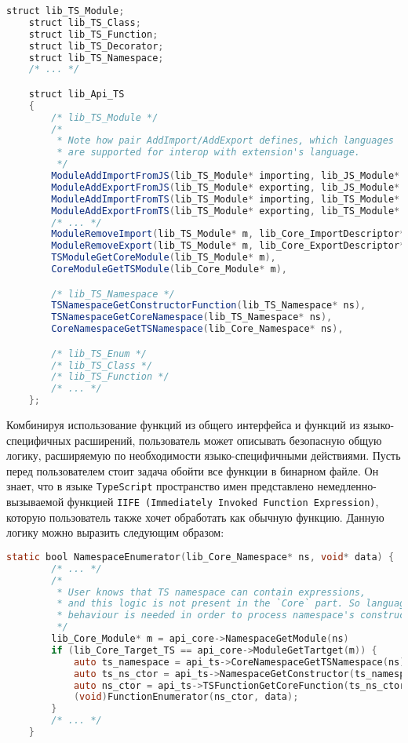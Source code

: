 \begin{lstlisting}[language=Java, caption=Примерный код расширения \texttt{Typescript}., label=lst:libTsExtension]
    struct lib_TS_Module;
    struct lib_TS_Class;
    struct lib_TS_Function;
    struct lib_TS_Decorator;
    struct lib_TS_Namespace;
    /* ... */

    struct lib_Api_TS
    {
        /* lib_TS_Module */
        /*
         * Note how pair AddImport/AddExport defines, which languages
         * are supported for interop with extension's language.
         */
        ModuleAddImportFromJS(lib_TS_Module* importing, lib_JS_Module* imported, ... payload);
        ModuleAddExportFromJS(lib_TS_Module* exporting, lib_JS_Module* exported, ... payload);
        ModuleAddImportFromTS(lib_TS_Module* importing, lib_TS_Module* imported, ... payload);
        ModuleAddExportFromTS(lib_TS_Module* exporting, lib_TS_Module* exported, ... payload);
        /* ... */
        ModuleRemoveImport(lib_TS_Module* m, lib_Core_ImportDescriptor* id);
        ModuleRemoveExport(lib_TS_Module* m, lib_Core_ExportDescriptor* ed);
        TSModuleGetCoreModule(lib_TS_Module* m),
        CoreModuleGetTSModule(lib_Core_Module* m),

        /* lib_TS_Namespace */
        TSNamespaceGetConstructorFunction(lib_TS_Namespace* ns),
        TSNamespaceGetCoreNamespace(lib_TS_Namespace* ns),
        CoreNamespaceGetTSNamespace(lib_Core_Namespace* ns),

        /* lib_TS_Enum */
        /* lib_TS_Class */
        /* lib_TS_Function */
        /* ... */
    };
\end{lstlisting}

Комбинируя использование функций из общего интерфейса и функций из языко-специфичных расширений, пользователь может описывать безопасную общую логику, расширяемую по необходимости языко-специфичными действиями. Пусть перед пользователем стоит задача обойти все функции в бинарном файле. Он знает, что в языке \texttt{TypeScript} пространство имен представлено немедленно-вызываемой функцией \texttt{IIFE~(Immediately~Invoked~Function~Expression)}, которую пользователь также хочет обработать как обычную функцию. Данную логику можно выразить следующим образом:

\begin{lstlisting}[language=C, label=lst:getTsNamespace]
    static bool NamespaceEnumerator(lib_Core_Namespace* ns, void* data) {
        /* ... */
        /*
         * User knows that TS namespace can contain expressions,
         * and this logic is not present in the `Core` part. So language-specific
         * behaviour is needed in order to process namespace's constructor.
         */
        lib_Core_Module* m = api_core->NamespaceGetModule(ns)
        if (lib_Core_Target_TS == api_core->ModuleGetTartget(m)) {
            auto ts_namespace = api_ts->CoreNamespaceGetTSNamespace(ns);
            auto ts_ns_ctor = api_ts->NamespaceGetConstructor(ts_namespace);
            auto ns_ctor = api_ts->TSFunctionGetCoreFunction(ts_ns_ctor);
            (void)FunctionEnumerator(ns_ctor, data);
        }
        /* ... */
    }
\end{lstlisting}


